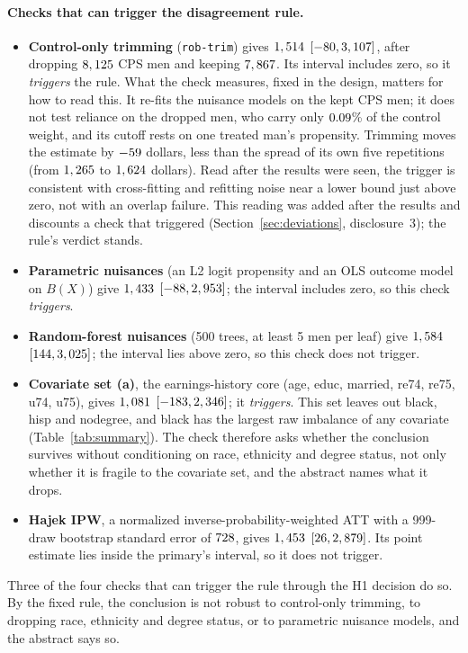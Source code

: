 \documentclass[11pt]{article}
\newcommand{\run}[1]{\texttt{#1}}
\newcommand{\ci}[2]{$[#1, #2]$}
\begin{document}
\paragraph{Checks that can trigger the disagreement rule.}
\begin{itemize}
  \setlength{\itemsep}{1pt}
  \item \textbf{Control-only trimming} (\run{rob-trim}) gives $1,514$
        \ci{\TrimCiLow}{\TrimCiHigh}, after dropping $8,125$ CPS men and
        keeping $7,867$. Its interval includes zero, so it \emph{triggers} the
        rule. What the check measures, fixed in the design, matters for how to read this. It re-fits the nuisance
        models on the kept CPS men; it does not test reliance on the dropped men, who carry
        only $0.09$\% of the control weight, and its cutoff rests on one
        treated man's propensity. Trimming moves the estimate by $-59$ dollars,
        less than the spread of its own five repetitions (from $1,265$ to $1,624$
        dollars). Read after the results were seen, the trigger is consistent with
        cross-fitting and refitting noise near a lower bound just above zero, not with an
        overlap failure. This reading was added after the results and discounts a check that
        triggered (Section~\ref{sec:deviations}, disclosure~3); the rule's verdict stands.
  \item \textbf{Parametric nuisances} (an L2 logit propensity and an OLS outcome model on
        $B(X)$) give $1,433$ \ci{\LearnerLinearCiLow}{\LearnerLinearCiHigh};
        the interval includes zero, so this check \emph{triggers}.
  \item \textbf{Random-forest nuisances} (500 trees, at least 5 men per leaf) give
        $1,584$ \ci{\LearnerRfCiLow}{\LearnerRfCiHigh}; the interval lies above
        zero, so this check does not trigger.
  \item \textbf{Covariate set (a)}, the earnings-history core (age, educ, married, re74,
        re75, u74, u75), gives $1,081$ \ci{\CovsetACiLow}{\CovsetACiHigh}; it
        \emph{triggers}. This set leaves out black, hisp and nodegree, and black has the
        largest raw imbalance of any covariate (Table~\ref{tab:summary}). The check
        therefore asks whether the conclusion survives without conditioning on race,
        ethnicity and degree status, not only whether it is fragile to the covariate set,
        and the abstract names what it drops.
  \item \textbf{Hajek IPW}, a normalized inverse-probability-weighted ATT with a
        999-draw bootstrap standard error of $728$, gives $1,453$
        \ci{\IpwCiLow}{\IpwCiHigh}. Its point estimate lies inside the primary's interval, so
        it does not trigger.
\end{itemize}
Three of the four checks that can trigger the rule through the H1 decision do so. By the fixed rule, the
conclusion is not robust to control-only trimming, to dropping race, ethnicity and degree
status, or to parametric nuisance models, and the abstract says so.
\end{document}

